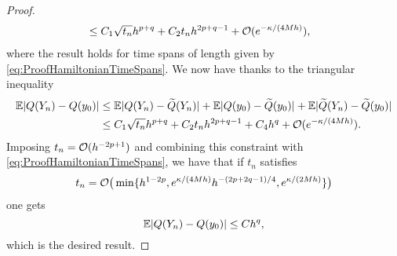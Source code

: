 \documentclass[10pt]{article}
\begin{document}
\begin{proof}
\begin{equation}
\begin{aligned}
		&\leq C_1 \sqrt{t_n} h^{p+q} + C_2 t_n h^{2p+q-1} + \mathcal{O}(e^{-\kappa/(4Mh)}),
	\end{aligned}
	\end{equation}
	where the result holds for time spans of length given by \eqref{eq:ProofHamiltonianTimeSpans}. We now have thanks to the triangular inequality
	\begin{equation}
	\begin{aligned}
		\operatorname{\mathbb{E}}\lvert Q(Y_n) - Q(y_0)\rvert &\leq \operatorname{\mathbb{E}}\lvert Q(Y_n) - \widetilde Q(Y_n)\rvert + \operatorname{\mathbb{E}} \lvert Q(y_0) - \widetilde Q (y_0)\rvert + \operatorname{\mathbb{E}}\lvert\widetilde Q(Y_n) - \widetilde Q(y_0)\rvert \\
		&\leq C_1 \sqrt{t_n} h^{p+q} + C_2 t_n h^{2p+q-1} + C_4h^q + \mathcal{O}(e^{-\kappa/(4Mh)}).
	\end{aligned}
	\end{equation}
	Imposing $t_n = \mathcal{O}(h^{-2p + 1})$ and combining this constraint with \eqref{eq:ProofHamiltonianTimeSpans}, we have that if $t_n$ satisfies
	\begin{equation}
		t_n = \mathcal{O}\big(\min\{h^{1-2p}, e^{\kappa/(4Mh)} h^{-(2p+2q-1)/4}, e^{\kappa/(2Mh)}\}\big)
	\end{equation}
	one gets
	\begin{equation}
	\operatorname{\mathbb{E}}\lvert Q(Y_n) - Q(y_0)\rvert \leq Ch^{q},
	\end{equation}
	which is the desired result.
\end{proof}
\end{document}
